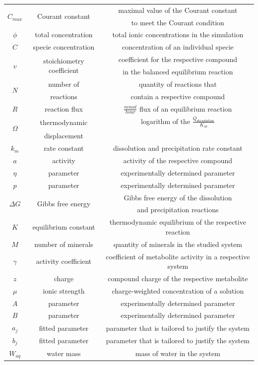 \begin{longtable}{c|c|c}
    \multirow{2}{2em}{$C_{max}$} & \multirow{2}{3em}{Courant constant} & maximal value of the Courant constant \\& & to meet the Courant condition \\ \midrule
    $\phi$ & total concentration & total ionic concentrations in the simulation \\ \midrule
    $C$ & specie concentration & concentration of an individual specie \\ \midrule
    \multirow{2}{1em}{$v$} & \multirow{2}{3em}{stoichiometry coefficient} & coefficient for the respective compound \\& & in the balanced equilibrium reaction \\ \midrule
    \multirow{2}{1em}{$N$} & number of & quantity of reactions that \\& reactions & contain a respective compound \\ \midrule
    $R$ & reaction flux & $\frac{mmol}{hour}$ flux of an equilibrium reaction \\ \midrule
    \multirow{2}{1em}{$\Omega$} & thermodynamic & logarithm of the $\frac{Q_{dissolution}}{K_{sp}}$ \\& displacement & \\ \midrule
    $k_m$ & rate constant & dissolution and precipitation rate constant \\ \midrule
    $a$ & activity & activity of the respective compound \\ \midrule
    $\eta$ & parameter & experimentally determined parameter \\ \midrule
    $p$ & parameter & experimentally determined parameter \\ \midrule
    \multirow{2}{2em}{$\Delta G$} & \multirow{2}{5em}{Gibbs free energy} & Gibbs free energy of the dissolution \\& & and precipitation reactions \\ \midrule
    $K$ & equilibrium constant & thermodynamic equilibrium of the respective reaction \\ \midrule
    $M$ & number of minerals & quantity of minerals in the studied system \\ \midrule
    $\gamma$ & activity coefficient & coefficient of metabolite activity in a respective system \\ \midrule
    $z$ & charge & compound charge of the respective metabolite \\ \midrule
    $\mu$ & ionic strength & charge-weighted concentration of a solution \\ \midrule
    $A$ & parameter & experimentally determined parameter \\ \midrule
    $B$ & parameter & experimentally determined parameter \\ \midrule
    $a_j$ & fitted parameter & parameter that is tailored to justify the system \\ \midrule
    $b_j$ & fitted parameter & parameter that is tailored to justify the system \\ \midrule
    $W_{aq}$ & water mass & mass of water in the system \\ \bottomrule
\end{longtable} 


